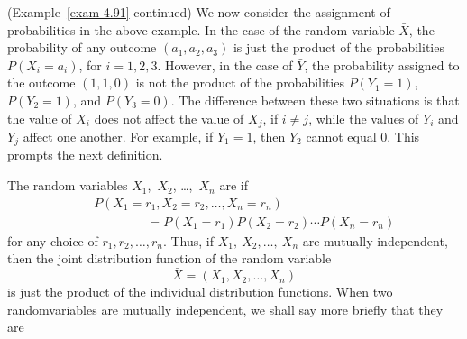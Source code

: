 \begin{example}(Example~\ref{exam 4.91} continued){\label{exam 4.93}}
We now consider the assignment of probabilities in the above example.  In the case of the
random variable ${\bar X}$, the probability of any outcome $(a_1, a_2, a_3)$ is just the
product of the probabilities $P(X_i = a_i)$, for $i = 1, 2, 3$.  However, in the case of
${\bar Y}$, the probability assigned to the outcome $(1, 1, 0)$ is not the product of
the probabilities $P(Y_1 = 1)$, $P(Y_2 = 1)$, and $P(Y_3 = 0)$.  The difference between these
two situations is that the value of $X_i$ does not affect the value of $X_j$, if $i \ne j$,
while the values of $Y_i$ and $Y_j$ affect one another.  For example, if $Y_1 = 1$, then
$Y_2$ cannot equal 0.  This prompts the next definition.
\end{example}

\begin{definition}\label{def 4.4.5}
The random variables $X_1$,~$X_2$, \ldots,~$X_n$ are  if
\begin{eqnarray*}
&&P(X_1 = r_1, X_2 = r_2, \ldots, X_n = r_n)   \\
&& \;\;\;\;\;\;\;\;\;\;\;\;\;\;\; = P(X_1 = r_1) P(X_2 = r_2) \cdots  P(X_n = r_n)
\end{eqnarray*} 
for any choice of $r_1, r_2, \ldots, r_n$.  Thus, if $X_1,~X_2, \ldots,~X_n$ are mutually
independent, then the joint distribution function of the random variable 
$${\bar X} = (X_1, X_2, \ldots, X_n)$$
is just the product of the individual distribution
functions.  When two random\linebreak[4] variables are mutually independent, we shall say more
briefly that they are 
\end{definition}

